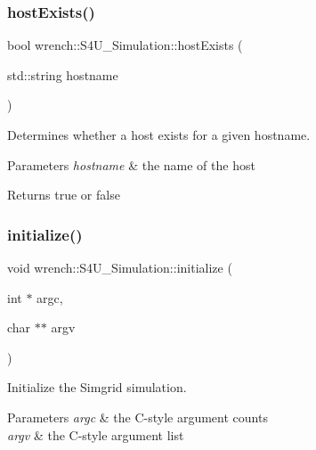 \subsubsection{\texorpdfstring{host\+Exists()}{hostExists()}}
{\footnotesize\ttfamily bool wrench\+::\+S4\+U\+\_\+\+Simulation\+::host\+Exists (\begin{DoxyParamCaption}\item[{std\+::string}]{hostname }\end{DoxyParamCaption})\hspace{0.3cm}{\ttfamily [static]}}



Determines whether a host exists for a given hostname. 


\begin{DoxyParams}{Parameters}
{\em hostname} & the name of the host \\
\hline
\end{DoxyParams}
\begin{DoxyReturn}{Returns}
true or false 
\end{DoxyReturn}
\mbox{\label{classwrench_1_1_s4_u___simulation_a70b123a78f90e8e1f432111c3ce93929}} 
\subsubsection{\texorpdfstring{initialize()}{initialize()}}
{\footnotesize\ttfamily void wrench\+::\+S4\+U\+\_\+\+Simulation\+::initialize (\begin{DoxyParamCaption}\item[{int $\ast$}]{argc,  }\item[{char $\ast$$\ast$}]{argv }\end{DoxyParamCaption})}



Initialize the Simgrid simulation. 


\begin{DoxyParams}{Parameters}
{\em argc} & the C-\/style argument counts \\
\hline
{\em argv} & the C-\/style argument list \\
\hline
\end{DoxyParams}
\mbox{\label{classwrench_1_1_s4_u___simulation_a0139f6818fee5e36c1ac3cc18c417be7}} 
